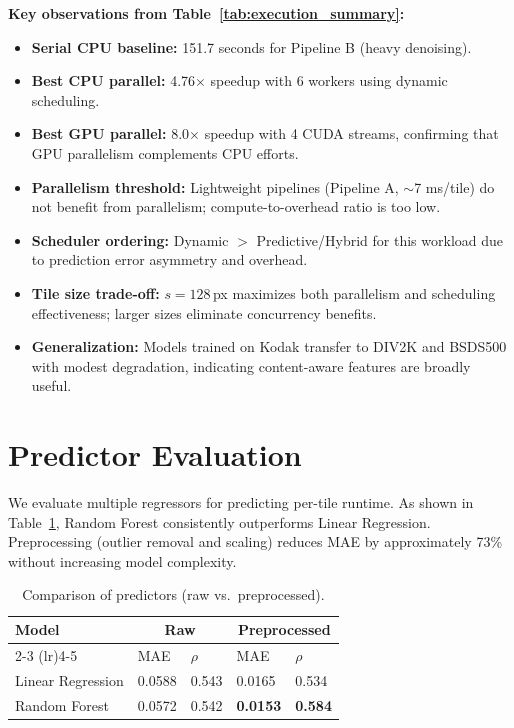 \documentclass[acmsmall]{acmart}
\begin{document}
\textbf{Key observations from Table~\ref{tab:execution_summary}:}
\begin{itemize}
  \item \textbf{Serial CPU baseline:} 151.7 seconds for Pipeline B (heavy denoising).
  \item \textbf{Best CPU parallel:} 4.76$\times$ speedup with 6 workers using dynamic scheduling.
  \item \textbf{Best GPU parallel:} 8.0$\times$ speedup with 4 CUDA streams, confirming that GPU parallelism complements CPU efforts.
  \item \textbf{Parallelism threshold:} Lightweight pipelines (Pipeline A, $\sim$7 ms/tile) do not benefit from parallelism; compute-to-overhead ratio is too low.
  \item \textbf{Scheduler ordering:} Dynamic $>$ Predictive/Hybrid for this workload due to prediction error asymmetry and overhead.
  \item \textbf{Tile size trade-off:} $s = 128$\,px maximizes both parallelism and scheduling effectiveness; larger sizes eliminate concurrency benefits.
  \item \textbf{Generalization:} Models trained on Kodak transfer to DIV2K and BSDS500 with modest degradation, indicating content-aware features are broadly useful.
\end{itemize}


\section{Predictor Evaluation}
\label{sec:predictor}

We evaluate multiple regressors for predicting per-tile runtime. 
As shown in Table~\ref{tab:predictor}, Random Forest consistently outperforms Linear Regression. 
Preprocessing (outlier removal and scaling) reduces MAE by approximately 73\% without increasing model complexity.

\begin{table}[htbp]
  \centering
  \caption{Comparison of predictors (raw vs.\ preprocessed).}
  \label{tab:predictor}
  \small
  \begin{tabularx}{\linewidth}{lXXXX}
    \toprule
    \multirow{2}{*}{\textbf{Model}} & \multicolumn{2}{c}{\textbf{Raw}} & \multicolumn{2}{c}{\textbf{Preprocessed}} \\
    \cmidrule(lr){2-3} \cmidrule(lr){4-5}
    & MAE & $\rho$ & MAE & $\rho$ \\
    \midrule
    Linear Regression & 0.0588 & 0.543 & 0.0165 & 0.534 \\
    Random Forest     & 0.0572 & 0.542 & \textbf{0.0153} & \textbf{0.584} \\
    \bottomrule
  \end{tabularx}
\end{table}
\end{document}
